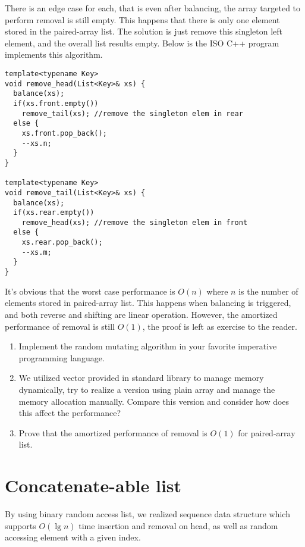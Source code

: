 \documentclass[UTF8]{article}
\begin{document}
There is an edge case for each, that is even after balancing, the array targeted to
perform removal is still empty. This happens that there is only one element stored
in the paired-array list. The solution is just remove this singleton left element,
and the overall list results empty. Below is the ISO C++ program implements this
algorithm.

\begin{lstlisting}
template<typename Key>
void remove_head(List<Key>& xs) {
  balance(xs);
  if(xs.front.empty())
    remove_tail(xs); //remove the singleton elem in rear
  else {
    xs.front.pop_back();
    --xs.n;
  }
}

template<typename Key>
void remove_tail(List<Key>& xs) {
  balance(xs);
  if(xs.rear.empty())
    remove_head(xs); //remove the singleton elem in front
  else {
    xs.rear.pop_back();
    --xs.m;
  }
}
\end{lstlisting}

It's obvious that the worst case performance is $O(n)$ where $n$ is the number of elements
stored in paired-array list. This happens when balancing is triggered, and both reverse
and shifting are linear operation. However, the amortized performance of removal is still
$O(1)$, the proof is left as exercise to the reader.

\begin{Exercise}
\begin{enumerate}
\item Implement the random mutating algorithm in your favorite imperative programming language.
\item We utilized vector provided in standard library to manage memory dynamically, try to realize
a version using plain array and manage the memory allocation manually. Compare this version and
consider how does this affect the performance?
\item Prove that the amortized performance of removal is $O(1)$ for paired-array list.
\end{enumerate}
\end{Exercise}

\section{Concatenate-able list}
By using binary random access list, we realized sequence data structure which
supports $O(\lg n)$ time insertion and removal on head, as well as random accessing element
with a given index.
\end{document}
